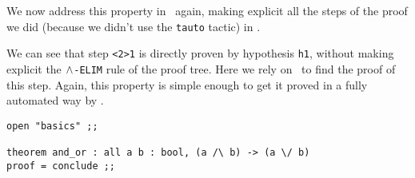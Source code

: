 We now address this property in \focal\ again, making explicit all the
steps of the proof we did (because we didn't use the \verb"tauto"
tactic) in \coq.

{\scriptsize
}

We can see that step \lstinline"<2>1" is directly proven by hypothesis
\verb"h1", without making explicit the $\wedge${\tt -ELIM} rule of
the proof tree. Here we rely on \zenon\ to find the proof of this
step. Again, this property is simple enough to get it proved in a
fully automated way by \zenon.

{\scriptsize
\begin{lstlisting}
open "basics" ;;

theorem and_or : all a b : bool, (a /\ b) -> (a \/ b)
proof = conclude ;;
\end{lstlisting}}
